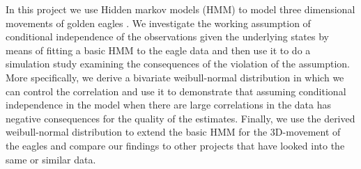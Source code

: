 In this project we use Hidden markov models (HMM) to model three dimensional movements of golden eagles \cite{eagleData}. We investigate the working assumption of conditional independence of the observations given the underlying states by means of fitting a basic HMM to the eagle data and then use it to do a simulation study examining the consequences of the violation of the assumption. More specifically, we derive a bivariate weibull-normal distribution in which we can control the correlation and use it to demonstrate that assuming conditional independence in the model when there are large correlations in the data has negative consequences for the quality of the estimates. Finally, we use the derived weibull-normal distribution to extend the basic HMM for the 3D-movement of the eagles and compare our findings to other projects that have looked into the same or similar data. 
